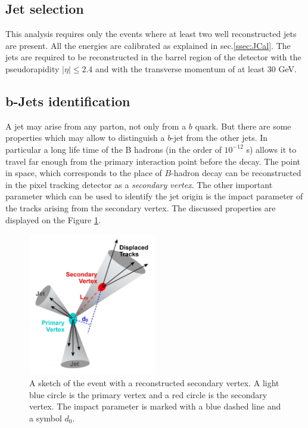 \subsection{Jet selection}

This analysis requires only the events where at least two well reconstructed jets are present. All the energies are calibrated as explained in sec.\ref{ssec:JCal}.
The jets are required to be reconstructed in the barrel region of the detector with the pseudorapidity $|\eta| \leq 2.4$ and with the transverse momentum of at least 
30 GeV. 

\subsection{b-Jets identification}\label{ssec:bTag}

A jet may arise from any parton, not only from a $b$ quark. But there are some properties which may allow to distinguish a $b$-jet from the other jets. In particular
a long life time of the B hadrons (in the order of $10^{-12}$ s) allows it to travel far enough from the primary interaction point before the decay. The point
in space, which corresponds to the place of $B$-hadron decay can be reconstructed in the pixel tracking detector as a \textit{secondary vertex}. The other important
parameter which can be used to identify the jet origin is the impact parameter of the tracks arising from the secondary vertex. The discussed properties are 
displayed on the Figure \ref{fig:SV}.

\begin{figure}[t]
  \centering
  \includegraphics[width=0.5\textwidth]{04_event_reconstruction/plots/btagging_cartoon.png}
  \caption{A sketch of the event with a reconstructed secondary vertex. A light blue circle is the primary vertex and a red circle is the secondary vertex. The impact 
  parameter is marked with a blue dashed line and a symbol $d_{0}$.}
  \label{fig:SV}
\end{figure}

